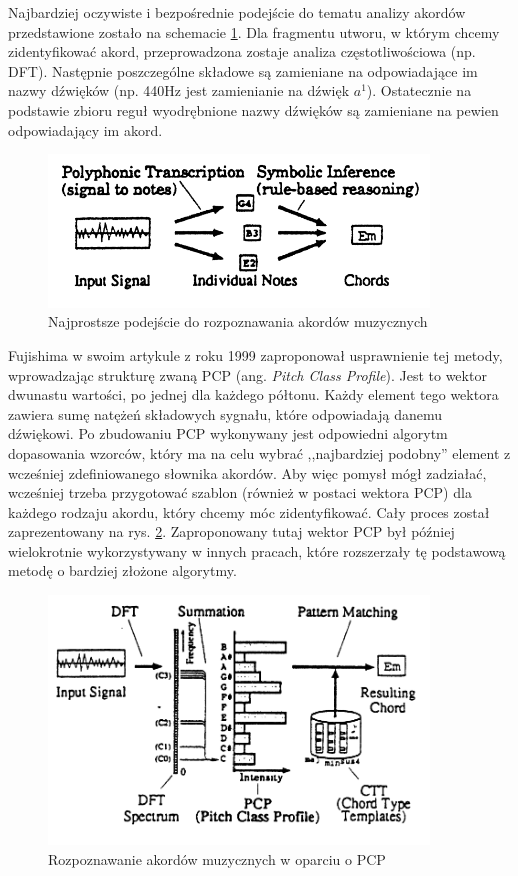 Najbardziej oczywiste i bezpośrednie podejście do tematu analizy akordów przedstawione zostało na schemacie \ref{fig:rozpoznawanie_stare_1}. Dla fragmentu utworu, w którym chcemy zidentyfikować akord, przeprowadzona zostaje analiza częstotliwościowa (np. DFT). Następnie poszczególne składowe są zamieniane na odpowiadające im nazwy dźwięków (np. 440Hz jest zamienianie na dźwięk $a^1$). Ostatecznie na podstawie zbioru reguł wyodrębnione nazwy dźwięków są zamieniane na pewien odpowiadający im akord.

\begin{figure}[htb]
    \centering
    \includegraphics[width=0.9\textwidth]{images/rozpoznawanie_stare_1}
    \caption{Najprostsze podejście do rozpoznawania akordów muzycznych \cite{fujishima_realtime_1999}}
    \label{fig:rozpoznawanie_stare_1}
\end{figure}

Fujishima \cite{fujishima_realtime_1999} w swoim artykule z roku 1999 zaproponował usprawnienie tej metody, wprowadzając strukturę zwaną PCP (ang. \emph{Pitch Class Profile}). Jest to wektor dwunastu wartości, po jednej dla każdego półtonu. Każdy element tego wektora zawiera sumę natężeń składowych sygnału, które odpowiadają danemu dźwiękowi. Po zbudowaniu PCP wykonywany jest odpowiedni algorytm dopasowania wzorców, który ma na celu wybrać ,,najbardziej podobny'' element z wcześniej zdefiniowanego słownika akordów. Aby więc pomysł mógł zadziałać, wcześniej trzeba przygotować szablon (również w postaci wektora PCP) dla każdego rodzaju akordu, który chcemy móc zidentyfikować. Cały proces został zaprezentowany na rys. \ref{fig:rozpoznawanie_stare_2}. Zaproponowany tutaj wektor PCP był później wielokrotnie wykorzystywany w innych pracach, które rozszerzały tę podstawową metodę o bardziej złożone algorytmy.

\begin{figure}[htb]
    \centering
    \includegraphics[width=0.9\textwidth]{images/rozpoznawanie_stare_2}
    \caption{Rozpoznawanie akordów muzycznych w oparciu o PCP \cite{fujishima_realtime_1999}}
    \label{fig:rozpoznawanie_stare_2}
\end{figure}
